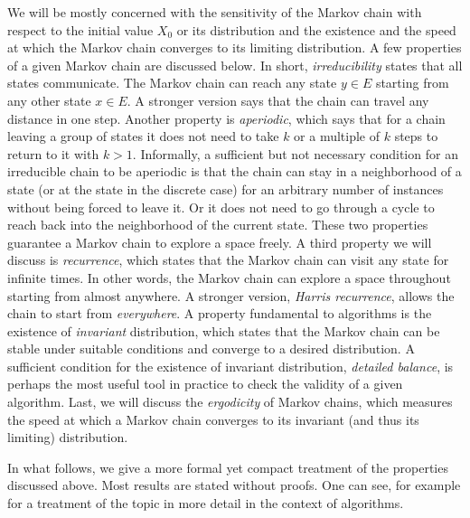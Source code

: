
We will be mostly concerned with the sensitivity of the Markov chain with
respect to the initial value $X_0$ or its distribution and the existence and
the speed at which the Markov chain converges to its limiting distribution. A
few properties of a given Markov chain are discussed below. In short,
\emph{irreducibility} states that all states communicate. The Markov chain can
reach any state $y\in E$ starting from any other state $x\in E$. A stronger
version says that the chain can travel any distance in one step. Another
property is \emph{aperiodic}, which says that for a chain leaving a group of
states it does not need to take $k$ or a multiple of $k$ steps to return to it
with $k>1$. Informally, a sufficient but not necessary condition for an
irreducible chain to be aperiodic is that the chain can stay in a neighborhood
of a state (or at the state in the discrete case) for an arbitrary number of
instances without being forced to leave it. Or it does not need to go through
a cycle to reach back into the neighborhood of the current state. These two
properties guarantee a Markov chain to explore a space freely. A third
property we will discuss is \emph{recurrence}, which states that the Markov
chain can visit any state for infinite times. In other words, the Markov chain
can explore a space throughout starting from almost anywhere. A stronger
version, \emph{Harris recurrence}, allows the chain to start from
\emph{everywhere}. A property fundamental to \mcmc algorithms is the existence
of \emph{invariant} distribution, which states that the Markov chain can be
stable under suitable conditions and converge to a desired distribution. A
sufficient condition for the existence of invariant distribution,
\emph{detailed balance}, is perhaps the most useful tool in practice to check
the validity of a given algorithm.  Last, we will discuss the
\emph{ergodicity} of Markov chains, which measures the speed at which a Markov
chain converges to its invariant (and thus its limiting) distribution.

In what follows, we give a more formal yet compact treatment of the properties
discussed above. Most results are stated without proofs. One can see, for
example \cite[][chap.~6]{Robert:2004tn} for a treatment of the topic in more
detail in the context of \mcmc algorithms.

